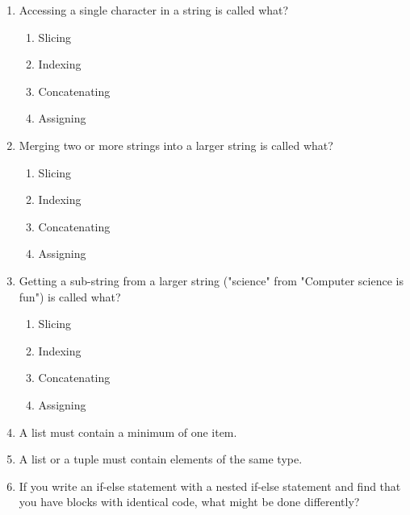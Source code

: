 \documentclass[letter,10pt]{article}
\begin{document}
\begin{enumerate}
    \item Accessing a single character in a string is called what?
    \begin{enumerate}
        \item Slicing
        \item Indexing
        \item Concatenating
        \item Assigning
    \end{enumerate}

    \item Merging two or more strings into a larger string is called what?
    \begin{enumerate}
        \item Slicing
        \item Indexing
        \item Concatenating
        \item Assigning
    \end{enumerate}

    \item Getting a sub-string from a larger string ("science" from "Computer science is fun") is called what?
    \begin{enumerate}
        \item Slicing
        \item Indexing
        \item Concatenating
        \item Assigning
    \end{enumerate}

    \item A list must contain a minimum of one item.

    \item A list or a tuple must contain elements of the same type.

    \item If you write an if-else statement with a nested if-else statement and find that you have blocks with identical code, what might be done differently?
\end{enumerate}
\end{document}
